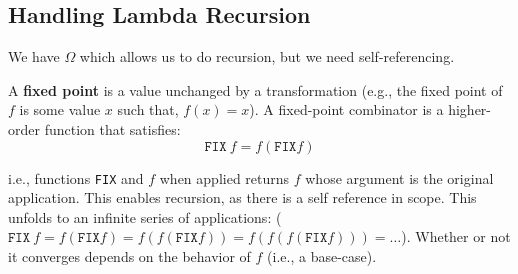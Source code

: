 
        
\newpage 

\subsection{Handling Lambda Recursion}
\noindent
We have $\Omega$ which allows us to do recursion, but we need self-referencing.

\begin{Def}
    
    A \textbf{fixed point} is a value unchanged by a transformation (e.g.,
    the fixed point of $f$ is some value $x$ such that, $f(x) = x$). A fixed-point combinator is a higher-order function that
    satisfies:
    \LARGE
    \[
     \texttt{FIX}\ f = f (\texttt{FIX} f)
    \]

    \normalsize
    \noindent
    i.e., functions \texttt{FIX} and $f$ when applied returns $f$ 
    whose argument is the original application. This enables recursion, as there is a 
    self reference in scope. This unfolds to an infinite series of applications:
    ($\texttt{FIX}\ f = f (\texttt{FIX} f)= f(f(\texttt{FIX} f)) = f(f(f(\texttt{FIX} f))) = \ldots$).
    Whether or not it converges depends on the behavior of $f$ (i.e., a base-case).
\end{Def}

